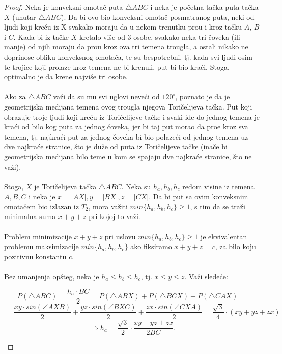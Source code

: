 \documentclass[11pt,letter]{article}
\begin{document}
\begin{proof}
Neka je konveksni omota\v c puta $\bigtriangleup ABC$ i neka je po\v cetna ta\v cka puta ta\v cka $X$ (unutar $\bigtriangleup ABC$). Da bi ovo bio konveksni omota\v c posmatranog puta, neki od ljudi koji kre\' cu iz X svakako moraju da u nekom trenutku pro\dj u i kroz ta\v cku $A$, $B$ i $C$. Kada bi iz ta\v cke $X$ kretalo vi\v se od 3 osobe, svakako neka tri \v coveka (ili manje) od njih moraju da pro\dj u kroz ova tri temena trougla, a ostali nikako ne doprinose obliku konveksnog omota\v ca, te su bespotrebni, tj. kada svi ljudi osim te trojice koji prolaze kroz temena ne bi krenuli, put bi bio kra\' ci. Stoga, optimalno je da krene najvi\v se tri osobe. 
\\
\\
\indent Ako za $\bigtriangleup ABC$ va\v zi da su mu svi uglovi neve\' ci od $120^\circ$, poznato je da je geometrijska medijana temena ovog trougla njegova Tori\v celijeva ta\v cka. Put koji obrazuje troje ljudi koji kre\' cu iz Tori\v celijeve ta\v cke i svaki ide do jednog temena je kra\' ci od bilo kog puta za jednog \v coveka, jer bi taj put morao da pro\dj e kroz sva temena, tj. najkra\' ci put za jednog \v coveka bi bio polaze\' ci od jednog temena uz dve najkra\' ce stranice, \v sto je du\v ze od puta iz Tori\v celijeve ta\v cke (ina\v ce bi geometrijska medijana bilo teme u kom se spajaju dve najkra\' ce stranice, \v sto ne va\v zi).
\\
\\
\indent Stoga, $X$ je Tori\v celijeva ta\v cka $\bigtriangleup ABC$. Neka su $h_a, h_b, h_c$ redom visine iz temena $A, B, C$ i neka je $x=|AX|, y=|BX|, z=|CX|$. Da bi put sa ovim konveksnim omota\v cem bio izlazan iz $T_2$, mora va\v ziti $min\{h_a,h_b,h_c\}\geqslant 1$, s tim da se tra\v zi minimalna suma $x+y+z$ pri kojoj to va\v zi.
\\
\\
\indent Problem minimizacije $x+y+z$ pri uslovu $min\{h_a,h_b,h_c\}\geqslant 1$ je ekvivalentan problemu maksimizacije $min\{h_a,h_b,h_c\}$ ako fiksiramo $x+y+z=c$, za bilo koju pozitivnu konstantu $c$.
\\
\\
\indent Bez umanjenja op\v steg, neka je $h_a\leqslant h_b\leqslant h_c$, tj. $x\leqslant y\leqslant z$. Va\v zi slede\' ce:
\begin{center}
$$P(\bigtriangleup ABC)=\frac{h_a\cdot BC}{2}=P(\bigtriangleup ABX)+P(\bigtriangleup BCX)+P(\bigtriangleup CAX)=$$
$$=\frac{xy\cdot sin(\angle AXB)}{2}+\frac{yz\cdot sin(\angle BXC)}{2}+\frac{zx\cdot sin(\angle CXA)}{2}=\frac{\sqrt3}{4}\cdot(xy+yz+zx)$$
$$\Longrightarrow h_a=\frac{\sqrt3}{2}\cdot \frac{xy+yz+zx}{2BC}.$$
\end{center}
\end{proof} 
\smallskip
\end{document}
